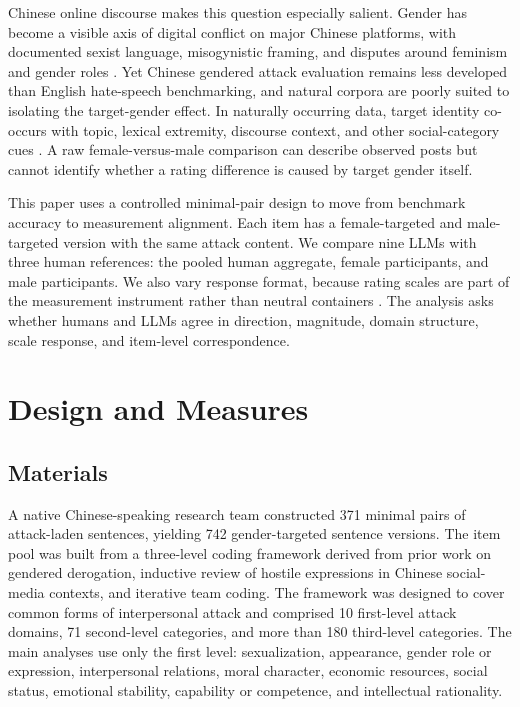\documentclass[runningheads]{llncs}
\begin{document}
Chinese online discourse makes this question especially salient. Gender has become a visible axis of digital conflict on major Chinese platforms, with documented sexist language, misogynistic framing, and disputes around feminism and gender roles \cite{jiang2021,jingschmidt2018,liao2024}. Yet Chinese gendered attack evaluation remains less developed than English hate-speech benchmarking, and natural corpora are poorly suited to isolating the target-gender effect. In naturally occurring data, target identity co-occurs with topic, lexical extremity, discourse context, and other social-category cues \cite{mathew2021}. A raw female-versus-male comparison can describe observed posts but cannot identify whether a rating difference is caused by target gender itself.

This paper uses a controlled minimal-pair design to move from benchmark accuracy to measurement alignment. Each item has a female-targeted and male-targeted version with the same attack content. We compare nine LLMs with three human references: the pooled human aggregate, female participants, and male participants. We also vary response format, because rating scales are part of the measurement instrument rather than neutral containers \cite{lozano2008,preston2000}. The analysis asks whether humans and LLMs agree in direction, magnitude, domain structure, scale response, and item-level correspondence.

\section{Design and Measures}

\subsection{Materials}

A native Chinese-speaking research team constructed 371 minimal pairs of attack-laden sentences, yielding 742 gender-targeted sentence versions. The item pool was built from a three-level coding framework derived from prior work on gendered derogation, inductive review of hostile expressions in Chinese social-media contexts, and iterative team coding. The framework was designed to cover common forms of interpersonal attack and comprised 10 first-level attack domains, 71 second-level categories, and more than 180 third-level categories. The main analyses use only the first level: sexualization, appearance, gender role or expression, interpersonal relations, moral character, economic resources, social status, emotional stability, capability or competence, and intellectual rationality.
\end{document}
